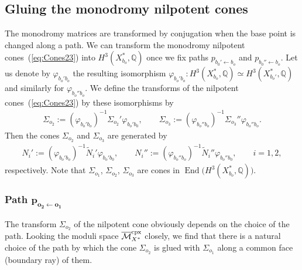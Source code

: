\documentclass[pdftex]{sigma}
\numberwithin{equation}{section}
\begin{document}
\subsection{Gluing the monodromy nilpotent cones} \label{sub:Gluing-MN-subsec}

The monodromy matrices are transformed by conjugation when the base point is changed along a path. We can transform the monodromy nilpotent cones~(\ref{eq:Cones23}) into $H^{3}(X_{b_{o}}^{*},\mathbb{Q})$ once we fix paths $p_{b_{0}'\leftarrow b_{o}}$ and $p_{b_{0}''\leftarrow b_{o}}$. Let us denote by $\varphi_{b_{o}'b_{o}}$ the resulting isomorphism $\varphi_{b_{o}'b_{o}}\colon H^{3}(X_{b_{o}}^{*},\mathbb{Q})\simeq H^{3}(X_{b_{o}'}^{*},\mathbb{Q})$ and similarly for $\varphi_{b_{o}''b_{o}}$. We define the transforms of the nilpotent cones~(\ref{eq:Cones23}) by these isomorphisms by
\begin{gather*}
\Sigma_{o_{2}}:=(\varphi_{b_{o}'b_{o}})^{-1} \Sigma_{o_{2}}' \varphi_{b_{o}'b_{0}} ,\qquad \Sigma_{o_{3}}:=(\varphi_{b_{o}''b_{o}})^{-1} \Sigma_{o_{3}}'' \varphi_{b_{o}''b_{o}}.%
\end{gather*}
Then the cones $\Sigma_{o_{2}}$ and $\Sigma_{o_{3}}$ are generated by
\begin{gather*}
N_{i}':=(\varphi_{b_{o}'b_{o}})^{-1} \tilde{N}_{i}' \varphi_{b_{o}'b_{0}},\qquad N_{i}'':=(\varphi_{b_{o}''b_{o}})^{-1} \tilde{N}_{i}'' \varphi_{b_{o}''b_{0}}, \qquad i=1,2,
\end{gather*} respectively. Note that $\Sigma_{o_{1}}$, $\Sigma_{o_{2}}$, $\Sigma_{o_{3}}$ are cones in $\operatorname{End}\big(H^{3}(X_{b_{o}}^{*},\mathbb{Q})\big)$.

\subsubsection[Path $p_{{o_2}\leftarrow {o_1}}$]{Path $\boldsymbol{p_{{o_2}\leftarrow {o_1}}}$}

The transform $\Sigma_{o_{2}}$ of the nilpotent cone obviously depends on the choice of the path. Looking the moduli space $\overline{\mathcal{M}}_{X^{*}}^{\rm cpx}$ closely, we find that there is a natural choice of the path by which the cone $\Sigma_{o_{2}}$ is glued with $\Sigma_{o_{1}}$ along a common face (boundary ray) of them.
\end{document}
